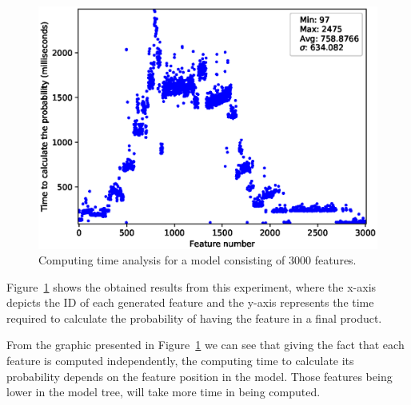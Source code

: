 \begin{figure}[h]
        \centering
        \linefigure
        \includegraphics[width=0.8\hsize,angle=0]{plot_probs_times_FeatureModel3000.eps}
        \linefigure
        \caption{Computing time analysis for a model consisting of 3000 features.}\label{fig:plot:probs:times}
\end{figure}

Figure~\ref{fig:plot:probs:times} shows the obtained
results from this experiment, where the x-axis depicts
the ID of each generated feature and the y-axis represents
the time required to calculate the probability of having the feature in a final product.




From the graphic presented in Figure~\ref{fig:plot:probs:times} we can see that giving the fact that each feature is computed independently, the
computing time to calculate its probability depends on the feature position in the model.
Those features being lower in the model tree, will take more
time in being computed.

